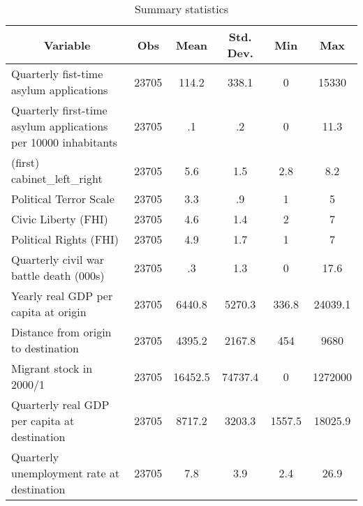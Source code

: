 \begin{table}[htbp]\centering \caption{Summary statistics\label{sumstat}}
\begin{tabular}{l c c c c c }\hline\hline
\multicolumn{1}{c}{Variable} & Obs & Mean & Std. Dev.
 & Min & Max  \\ \hline
Quarterly fist-time asylum applications & 23705 & 114.2 & 338.1 & 0 & 15330  \\
Quarterly first-time asylum applications per 10000 inhabitants & 23705 & .1 & .2 & 0 & 11.3  \\
(first) cabinet\_left\_right & 23705 & 5.6 & 1.5 & 2.8 & 8.2  \\
Political Terror Scale & 23705 & 3.3 & .9 & 1 & 5  \\
Civic Liberty (FHI) & 23705 & 4.6 & 1.4 & 2 & 7  \\
Political Rights (FHI) & 23705 & 4.9 & 1.7 & 1 & 7  \\
Quarterly civil war battle death (000s) & 23705 & .3 & 1.3 & 0 & 17.6  \\
Yearly real GDP per capita at origin & 23705 & 6440.8 & 5270.3 & 336.8 & 24039.1  \\
Distance from origin to destination & 23705 & 4395.2 & 2167.8 & 454 & 9680  \\
Migrant stock in 2000/1 & 23705 & 16452.5 & 74737.4 & 0 & 1272000  \\
Quarterly real GDP per capita at destination & 23705 & 8717.2 & 3203.3 & 1557.5 & 18025.9  \\
Quarterly unemployment rate at destination & 23705 & 7.8 & 3.9 & 2.4 & 26.9  \\
\hline\end{tabular}
\end{table}
